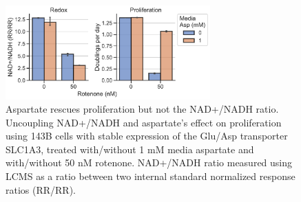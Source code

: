 \begin{figure}
    \centering
    \includegraphics[width=0.70\textwidth]{figures/chap1/redox-prlfr_uncpl.pdf}
    \caption[Aspartate rescues proliferation but not the NAD+/NADH ratio]{
    Aspartate rescues proliferation but not the NAD+/NADH ratio.
    Uncoupling NAD+/NADH and aspartate's effect on proliferation using 143B cells with stable expression of the Glu/Asp transporter SLC1A3, treated with/without 1 mM media aspartate and with/without 50 nM rotenone.
    NAD+/NADH ratio measured using LCMS as a ratio between two internal standard normalized response ratios (RR/RR).
    }
    \label{fig:ch1:redox-prlfr_uncpl}
\end{figure}





